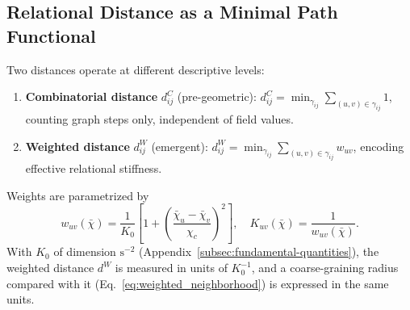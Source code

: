 \subsection{Relational Distance as a Minimal Path Functional}
\label{app:relational-distance-minimal-path}

Two distances operate at different descriptive levels:
\begin{enumerate}
  \item \textbf{Combinatorial distance} $d_{ij}^{C}$ (pre-geometric):
    $d_{ij}^{C} = \min_{\gamma_{ij}} \sum_{(u,v)\in\gamma_{ij}} 1$,
    counting graph steps only, independent of field values.
  \item \textbf{Weighted distance} $d_{ij}^{W}$ (emergent):
    $d_{ij}^{W} = \min_{\gamma_{ij}}
      \sum_{(u,v)\in\gamma_{ij}} w_{uv}$,
    encoding effective relational stiffness.
\end{enumerate}
Weights are parametrized by
\begin{equation}
  w_{uv}(\bar{\chi})
  = \frac{1}{K_0}
    \left[
      1 + \left(
        \frac{\bar{\chi}_u - \bar{\chi}_v}{\chi_c}
      \right)^{\!2}
    \right],
  \quad
  K_{uv}(\bar{\chi}) = \frac{1}{w_{uv}(\bar{\chi})}.
  \label{eq:weight_function_background}
\end{equation}
With $K_0$ of dimension $\mathrm{s}^{-2}$ (Appendix~\ref{subsec:fundamental-quantities}), the weighted distance
$d^{W}$ is measured in units of $K_0^{-1}$, and a coarse-graining radius compared with it
(Eq.~\eqref{eq:weighted_neighborhood}) is expressed in the same units.
